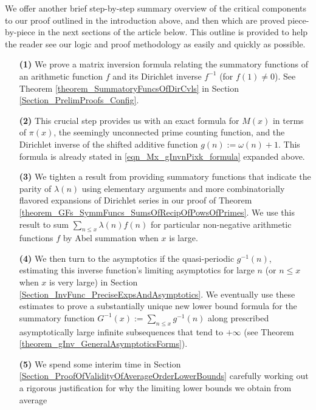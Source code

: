 \documentclass[11pt,reqno,a4letter]{article}
\numberwithin{figure}{section}
\numberwithin{table}{section}
\theoremstyle{plain}
\numberwithin{theorem}{section}
\theoremstyle{definition}
\begin{document}
We offer another brief step-by-step summary overview of the critical components 
to our proof outlined in the introduction above, 
and then which are proved piece-by-piece in the next sections of the article below. 
This outline is provided to help 
the reader see our logic and proof methodology as easily and quickly as possible. 
\begin{itemize} 

\item[\textbf{(1)}] We prove a matrix inversion formula relating the summatory 
           functions of an arithmetic function $f$ and its Dirichlet inverse $f^{-1}$ (for $f(1) \neq 0$). 
           See 
           Theorem \ref{theorem_SummatoryFuncsOfDirCvls} in 
           Section \ref{Section_PrelimProofs_Config}.  
\item[\textbf{(2)}] This crucial step provides us with an exact formula for $M(x)$ in terms of $\pi(x)$, the seemingly 
           unconnected prime counting function, and the 
           Dirichlet inverse of the shifted additive function $g(n) := \omega(n)+1$. This 
           formula is already stated in \eqref{eqn_Mx_gInvnPixk_formula} expanded above.  
\item[\textbf{(3)}] We tighten a result from \cite[\S 7]{MV} providing summatory functions that indicate the parity of 
           $\lambda(n)$ using elementary arguments and more combinatorially flavored expansions of Dirichlet series in 
           our proof of Theorem \ref{theorem_GFs_SymmFuncs_SumsOfRecipOfPowsOfPrimes}. 
           We use this result to sum $\sum_{n \leq x} \lambda(n) f(n)$ for particular non-negative arithmetic 
           functions $f$ by Abel summation when $x$ is large. 
\item[\textbf{(4)}] We then turn to the asymptotics if the quasi-periodic $g^{-1}(n)$, estimating this inverse function's 
           limiting asymptotics for large $n$ (or $n \leq x$ when $x$ is very large) in 
           Section \ref{Section_InvFunc_PreciseExpsAndAsymptotics}. 
           We eventually use these estimates to prove a substantially unique new lower bound formula 
           for the summatory function $G^{-1}(x) := \sum_{n \leq x} g^{-1}(n)$ along prescribed asymptotically large 
           infinite subsequences that tend to $+\infty$ (see Theorem \ref{theorem_gInv_GeneralAsymptoticsForms}). 
\item[\textbf{(5)}] We spend some interim time in Section \ref{Section_ProofOfValidityOfAverageOrderLowerBounds} 
           carefully working out a rigorous justification for why the limiting lower bounds we obtain from average 

\end{itemize}
\end{document}
